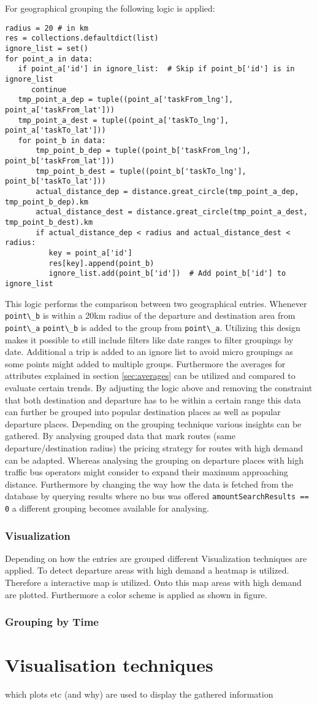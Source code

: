 For geographical grouping the following logic is applied:
\begin{lstlisting}
radius = 20 # in km
res = collections.defaultdict(list)
ignore_list = set()
for point_a in data:
   if point_a['id'] in ignore_list:  # Skip if point_b['id'] is in ignore_list
      continue
   tmp_point_a_dep = tuple((point_a['taskFrom_lng'], point_a['taskFrom_lat']))
   tmp_point_a_dest = tuple((point_a['taskTo_lng'], point_a['taskTo_lat']))
   for point_b in data:
	   tmp_point_b_dep = tuple((point_b['taskFrom_lng'], point_b['taskFrom_lat']))
       tmp_point_b_dest = tuple((point_b['taskTo_lng'], point_b['taskTo_lat']))
       actual_distance_dep = distance.great_circle(tmp_point_a_dep, tmp_point_b_dep).km
       actual_distance_dest = distance.great_circle(tmp_point_a_dest, tmp_point_b_dest).km
       if actual_distance_dep < radius and actual_distance_dest < radius:
          key = point_a['id']
          res[key].append(point_b)
          ignore_list.add(point_b['id'])  # Add point_b['id'] to ignore_list
\end{lstlisting}
This logic performs the comparison between two geographical entries. Whenever \verb|point\_b| is within a 20km radius of the departure and destination area from \verb|point\_a| \verb|point\_b| is added to the group from \verb|point\_a|. Utilizing this design makes it possible to still include filters like date ranges to filter groupings by date. Additional a trip is added to an ignore list to avoid micro groupings as some points might added to multiple groups. Furthermore the averages for attributes explained in section \ref{sec:averages} can be utilized and compared to evaluate certain trends. By adjusting the logic above and removing the constraint that both destination and departure has to be within a certain range this data can further be grouped into popular destination places as well as popular departure places. Depending on the grouping technique various insights can be gathered. By analysing grouped data that mark routes (same departure/destination radius) the pricing strategy for routes with high demand can be adapted. Whereas analysing the grouping on departure places with high traffic bus operators might consider to expand their maximum approaching distance. Furthermore by changing the way how the data is fetched from the database by querying results where no bus was offered \verb|amountSearchResults == 0| a different grouping becomes available for analysing. 
\subsubsection{Visualization}
Depending on how the entries are grouped different Visualization techniques are applied. To detect departure areas with high demand a heatmap is utilized. Therefore a interactive map is utilized. Onto this map areas with high demand are plotted. Furthermore a color scheme is applied as shown in figure. 




\subsubsection{Grouping by Time}






\section{Visualisation techniques}
which plots etc (and why) are used to display the gathered information 

